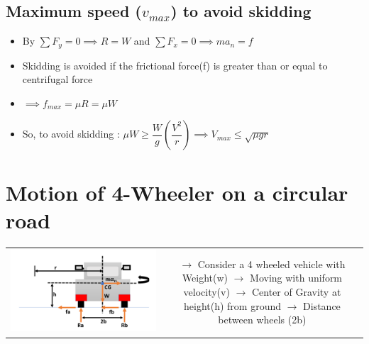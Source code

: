 \documentclass[8pt]{report}
\begin{document}
	\subsection{Maximum speed ($v_{max}$) to avoid skidding}
		\begin{itemize}
			\item By $\sum F_y = 0 \implies R = W$ and $\sum F_x=0 \implies ma_n=f$
			\item Skidding is avoided if the frictional force(f) is greater than or equal to centrifugal force
			\item $\implies f_{max} = \mu R = \mu W$
			\item So, to avoid skidding : $\mu W \geq \dfrac{W}{g}\left(\dfrac{V^2}{r}\right) \implies \boxed{V_{max}\le\sqrt{\mu gr}}$
		\end{itemize}\hrulefill
\section{Motion of 4-Wheeler on a circular road}
	\begin{table}[H]
		\begin{tabular}{cc}
			\parbox{4cm}{\includegraphics[scale=0.5]{4wheeler_circular.png}} & \hspace{5.8cm}
			\parbox{12cm}{$\rightarrow$ Consider a 4 wheeled vehicle with Weight(w)\\\\$\rightarrow$ Moving with uniform velocity(v)\\\\$\rightarrow$ Center of Gravity at height(h) from ground\\\\$\rightarrow$ Distance between wheels (2b)}
		\end{tabular}
	\end{table}
\end{document}

